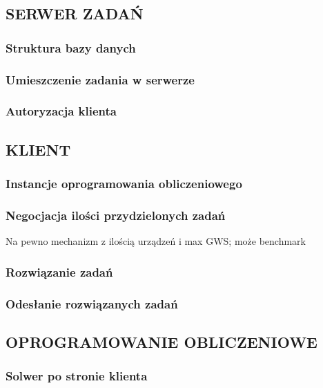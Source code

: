 \documentclass[12pt,a4paper,twoside]{article}
\begin{document}
\subsection{SERWER ZADAŃ}

\subsubsection{Struktura bazy danych}

\subsubsection{Umieszczenie zadania w serwerze}

\subsubsection{Autoryzacja klienta}

\subsection{KLIENT}

\subsubsection{Instancje oprogramowania obliczeniowego}

\subsubsection{Negocjacja ilości przydzielonych zadań}
\label{sec:negotiation}

Na pewno mechanizm z ilością urządzeń i max GWS; może benchmark

\subsubsection{Rozwiązanie zadań}

\subsubsection{Odesłanie rozwiązanych zadań}


\subsection{OPROGRAMOWANIE OBLICZENIOWE}

\subsubsection{Solwer po stronie klienta}
\end{document}
